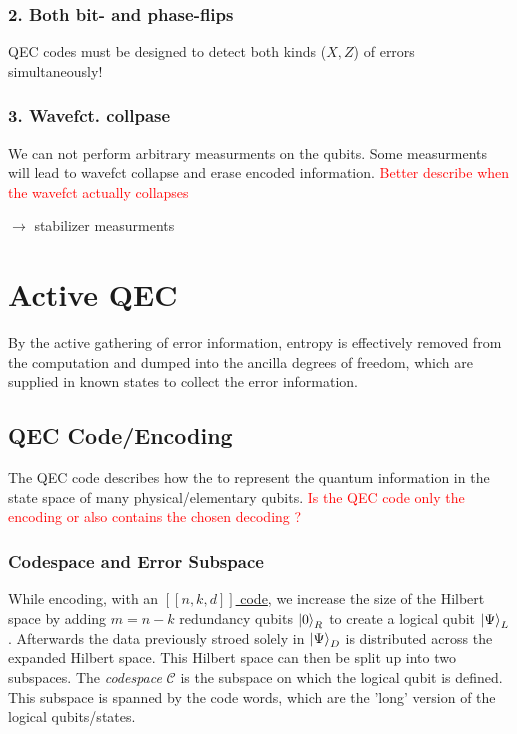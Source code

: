 \subsubsection{2. Both bit- and phase-flips}
QEC codes must be designed to detect both kinds ($X,Z$) of errors simultaneously!


\subsubsection{3. Wavefct. collpase}
We can not perform arbitrary measurments on the qubits. 
Some measurments will lead to wavefct collapse and erase encoded information.
\textcolor{red}{Better describe when the wavefct actually collapses}

$\rightarrow$ stabilizer measurments


\section{Active QEC}
By the active gathering of error information, entropy is effectively removed from the computation and dumped into the ancilla degrees of freedom, which are supplied in known states to collect the error information. \cite{QECmemory}


\subsection{QEC Code/Encoding}
The QEC code describes how the to represent the quantum information in the state space of many physical/elementary qubits. \cite{QECmemory}
\textcolor{red}{Is the QEC code only the encoding or also contains the chosen decoding ?}


\subsubsection{Codespace and Error Subspace}
While encoding, with an \hyperref[sssec:nkd_notation]{$[[n,k,d]]$ code}, we increase the size of the Hilbert space by adding $m=n-k$ redundancy qubits $\ket{0}_R$
to create a logical qubit $\ket{\Psi}_L$. 
Afterwards the data previously stroed solely in $\ket{\Psi}_D$ is distributed across the expanded Hilbert space.
This Hilbert space can then be split up into two subspaces. 
The \textit{codespace} $\mathcal{C}$ is the subspace on which the logical qubit is defined. \cite{QECintro}
This subspace is spanned by the code words, which are the 'long' version of the logical qubits/states.

